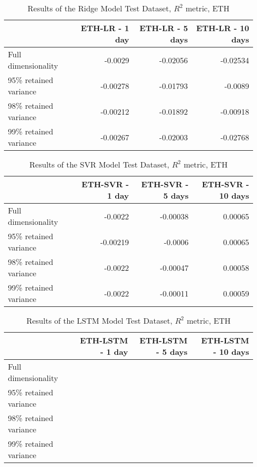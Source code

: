     \begin{table}[htbp]
        \centering
        \caption{Results of the Ridge Model Test Dataset, $R^2$ metric, ETH}
    \begin{tabular}{lrrr}
        \toprule
        {} &  ETH-LR - 1 day &  ETH-LR - 5 days &  ETH-LR - 10 days\\
        \midrule
        Full dimensionality   &   -0.0029   &    -0.02056   &    -0.02534    \\
        95\% retained variance &   -0.00278  &    -0.01793    &     -0.0089   \\
        98\% retained variance &    -0.00212    &     -0.01892    &    -0.00918  \\
        99\% retained variance &     -0.00267  &    -0.02003   &    -0.02768   \\
        \bottomrule
        \end{tabular}
    \end{table}
    
    \begin{table}[htbp]
        \centering
        \caption{Results of the SVR Model Test Dataset, $R^2$ metric, ETH}
    \begin{tabular}{lrrr}
        \toprule
        {} &  ETH-SVR - 1 day &  ETH-SVR - 5 days &  ETH-SVR - 10 days\\
        \midrule
        Full dimensionality     & -0.0022 &    -0.00038    &    0.00065     \\
        95\% retained variance   & -0.00219 &    -0.0006   &     0.00065   \\
        98\% retained variance   & -0.0022  &      -0.00047   &     0.00058     \\
        99\% retained variance   &  -0.0022 &      -0.00011   &    0.00059    \\
        \bottomrule
    \end{tabular}
    \end{table}
    
    \begin{table}[htbp]
        \centering
        \caption{Results of the LSTM Model Test Dataset, $R^2$ metric, ETH}
    \begin{tabular}{lrrr}
        \toprule
        {} &  ETH-LSTM - 1 day &  ETH-LSTM - 5 days &  ETH-LSTM - 10 days \\
        \midrule
        Full dimensionality   &       &           &           \\
        95\% retained variance &       &           &            \\
        98\% retained variance &       &          &            \\
        99\% retained variance &      &       &           \\
        \bottomrule
    \end{tabular}
    \end{table}
    

